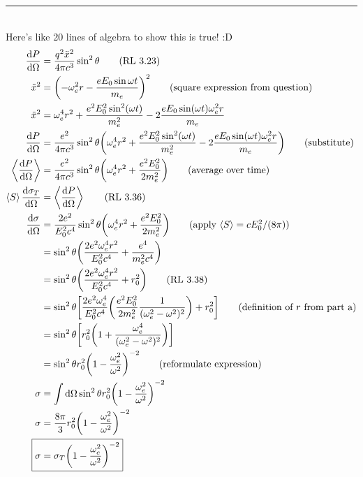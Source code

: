 \documentclass[12pt, letterpaper, twoside]{article}
\newcommand{\answer}[1]{
    \par\noindent\rule{\textwidth}{0.4pt}\\#1\\
}
\newcommand{\avg}[1]{\left\langle #1 \right\rangle}
\begin{document}
\answer{
    Here's like 20 lines of algebra to show this is true! :D
    \begin{align*}
        \dv{P}{\Omega} &= \frac{q^2 \ddot{x}^2}{4 \pi c^3} \sin^2 \theta \tag{RL 3.23} \\
        \ddot{x}^2 &= \qty(- \omega_e^2 r - \frac{e E_0 \sin \omega t}{m_e})^2 \tag{square expression from question} \\
        \ddot{x}^2 &= \omega_e^4 r^2 + \frac{e^2 E_0^2 \sin^2 (\omega t)}{m_e^2} - 2 \frac{e E_0 \sin (\omega t) \omega_e^2 r}{m_e} \\
        \dv{P}{\Omega} &= \frac{e^2}{4 \pi c^3} \sin^2 \theta \qty( \omega_e^4 r^2 + \frac{e^2 E_0^2 \sin^2 (\omega t)}{m_e^2} - 2 \frac{e E_0 \sin (\omega t) \omega_e^2 r}{m_e} ) \tag{substitute} \\
        \avg{\dv{P}{\Omega}} &= \frac{e^2}{4 \pi c^3} \sin^2 \theta \qty( \omega_e^4 r^2 + \frac{e^2 E_0^2}{2 m_e^2} ) \tag{average over time} \\
        \avg{S} \dv{\sigma_T}{\Omega} &= \avg{\dv{P}{\Omega}} \tag{RL 3.36} \\
        \dv{\sigma}{\Omega} &= \frac{2 e^2}{E_0^2 c^4} \sin^2 \theta \qty( \omega_e^4 r^2 + \frac{e^2 E_0^2}{2 m_e^2} ) \tag{apply $\avg{S} = c E_0^2 / (8 \pi)$} \\
        &= \sin^2 \theta \qty( \frac{2 e^2 \omega_e^4 r^2}{E_0^2 c^4} + \frac{e^4}{m_e^2 c^4} ) \\
        &= \sin^2 \theta \qty( \frac{2 e^2 \omega_e^4 r^2}{E_0^2 c^4} + r_0^2 ) \tag{RL 3.38} \\
        &= \sin^2 \theta \qty[ \frac{2 e^2 \omega_e^4}{E_0^2 c^4} \qty(\frac{e^2 E_0^2}{2 m_e^2} \frac{1}{(\omega_e^2 - \omega^2)^2}) + r_0^2 ] \tag{definition of $r$ from part a} \\
        &= \sin^2 \theta \qty[ r_0^2 \qty(1 + \frac{\omega_e^4}{(\omega_e^2 - \omega^2)^2}) ] \\
        &= \sin^2 \theta r_0^2 \qty(1 - \frac{\omega_e^2}{\omega^2})^{-2} \tag{reformulate expression} \\
        \sigma &= \int \dd{\Omega} \sin^2 \theta r_0^2 \qty(1 - \frac{\omega_e^2}{\omega^2})^{-2} \\
        \sigma &= \frac{8 \pi}{3} r_0^2 \qty(1 - \frac{\omega_e^2}{\omega^2})^{-2} \\
        \Aboxed{ \sigma &= \sigma_T \qty(1 - \frac{\omega_e^2}{\omega^2})^{-2} }
    \end{align*}
}

\newpage
\end{document}
